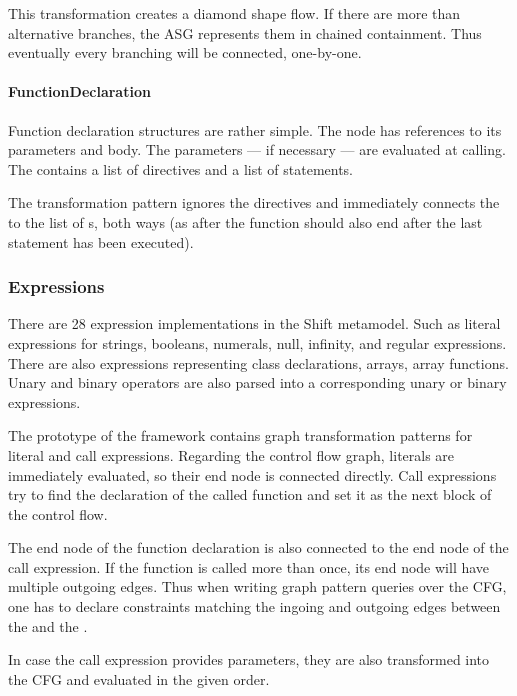 This transformation creates a diamond shape flow. If there are more than alternative branches, the ASG represents them in chained containment. Thus eventually every branching will be connected, one-by-one.

\paragraph{FunctionDeclaration}
Function declaration structures are rather simple. The node has references to its parameters and body. The parameters --- if necessary --- are evaluated at calling. The  contains a list of directives and a list of statements.

The transformation pattern ignores the directives and immediately connects the  to the list of s, both ways (as after the function should also end after the last statement has been executed).



\subsubsection{Expressions}
There are 28 expression implementations in the Shift metamodel. Such as literal expressions for strings, booleans, numerals, null, infinity, and regular expressions. There are also expressions representing class declarations, arrays, array functions. Unary and binary operators are also parsed into a corresponding unary or binary expressions.

The prototype of the framework contains graph transformation patterns for literal and call expressions. Regarding the control flow graph, literals are immediately evaluated, so their end node is connected directly. Call expressions try to find the declaration of the called function and set it as the next block of the control flow.

The end node of the function declaration is also connected to the end node of the call expression. If the function is called more than once, its end node will have multiple outgoing edges. Thus when writing graph pattern queries over the CFG, one has to declare constraints matching the ingoing and outgoing edges between the  and the .

In case the call expression provides parameters, they are also transformed into the CFG and evaluated in the given order.


